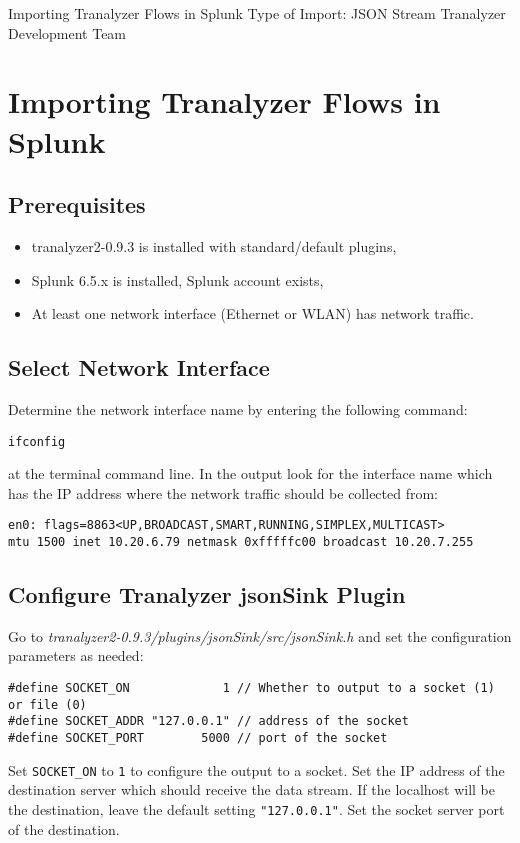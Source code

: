 \documentclass[documentation]{subfiles}
\begin{document}
\trantitle
    {Importing Tranalyzer Flows in Splunk}
    {Type of Import: JSON Stream} %
    {Tranalyzer Development Team} %

\section{Importing Tranalyzer Flows in Splunk}\label{splunk_tutorial}

\subsection{Prerequisites}
\begin{itemize}
    \item tranalyzer2-0.9.3 is installed with standard/default plugins,
    \item Splunk 6.5.x is installed, Splunk account exists,
    \item At least one network interface (Ethernet or WLAN) has network traffic.
\end{itemize}

\subsection{Select Network Interface}

Determine the network interface name by entering the following command:
\begin{verbatim}
ifconfig
\end{verbatim}
at the terminal command line. In the output look for the interface
name which has the IP address where the network traffic should be
collected from:
\begin{verbatim}
en0: flags=8863<UP,BROADCAST,SMART,RUNNING,SIMPLEX,MULTICAST>
mtu 1500 inet 10.20.6.79 netmask 0xfffffc00 broadcast 10.20.7.255
\end{verbatim}

\subsection{Configure Tranalyzer jsonSink Plugin}

Go to {\em tranalyzer2-0.9.3/plugins/jsonSink/src/jsonSink.h} and
set the configuration parameters as needed:
\begin{verbatim}
#define SOCKET_ON             1 // Whether to output to a socket (1) or file (0)
#define SOCKET_ADDR "127.0.0.1" // address of the socket
#define SOCKET_PORT        5000 // port of the socket
\end{verbatim}
Set {\tt SOCKET\_ON} to {\tt 1} to configure the output to a socket. Set the
IP address of the destination server which should receive the data
stream. If the localhost will be the destination, leave the default setting
{\tt "127.0.0.1"}. Set the socket server port of the destination.
\end{document}
